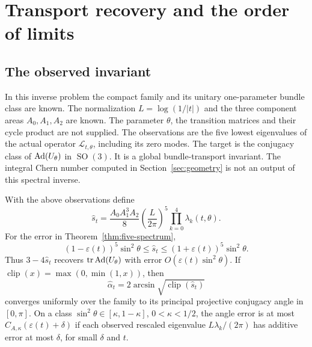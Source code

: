 \section{Transport recovery and the order of limits}\label{sec:inverse-limits}

\subsection{The observed invariant}
In this inverse problem the compact family and its unitary
one-parameter bundle class are known. The normalization
$L=\log(1/|t|)$ and the three component areas $A_0,A_1,A_2$ are known.
The parameter $\theta$, the transition matrices and their cycle
product are not supplied. The observations are the five lowest
eigenvalues of the actual operator $\mathcal L_{t,\theta}$, including
its zero modes. The target is the conjugacy class of
$\operatorname{Ad}(U_\theta)$ in $\operatorname{SO}(3)$.
It is a global bundle-transport invariant. The integral Chern number
computed in Section~\ref{sec:geometry} is not an output of this
spectral inverse.

\begin{theorem}\label{thm:transport-inverse}
With the above observations define
\begin{equation}\label{eq:transport-estimator}
 \widehat s_t=\frac{A_0A_1^3A_2}{8}
     \left(\frac{L}{2\pi}\right)^5\prod_{k=0}^4\lambda_k(t,\theta).
\end{equation}
For the error in Theorem~\ref{thm:five-spectrum},
\begin{equation}\label{eq:inverse-relative}
 (1-\varepsilon(t))^5\sin^2\theta
 \le\widehat s_t\le(1+\varepsilon(t))^5\sin^2\theta.
\end{equation}
Thus $3-4\widehat s_t$ recovers $\operatorname{tr}\operatorname{Ad}(U_\theta)$ with error
$O(\varepsilon(t)\sin^2\theta)$. If
$\operatorname{clip}(x)=\max(0,\min(1,x))$, then
\begin{equation}\label{eq:angle-estimator}
 \widehat\alpha_t=2\arcsin\sqrt{\operatorname{clip}(\widehat s_t)}
\end{equation}
converges uniformly over the family to its principal projective
conjugacy angle in $[0,\pi]$.
On a class $\sin^2\theta\in[\kappa,1-\kappa]$, $0<\kappa<1/2$,
the angle error is at most $C_{A,\kappa}(\varepsilon(t)+\delta)$
if each observed rescaled eigenvalue $L\lambda_k/(2\pi)$ has
additive error at most $\delta$, for small $\delta$ and $t$.
\end{theorem}

